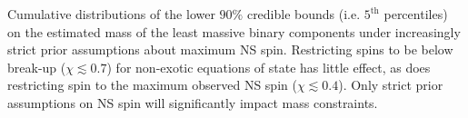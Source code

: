 \label{fig:restricted_priors} Cumulative distributions of the lower $90\%$ credible bounds (i.e. $5^\mathrm{th}$ percentiles) on the estimated mass of the least massive binary components under increasingly strict prior assumptions about maximum NS spin.  Restricting spins to be below break-up ($\chi\lesssim0.7$) for non-exotic equations of state has little effect, as does restricting spin to the maximum observed NS spin ($\chi\lesssim0.4$).  Only strict prior assumptions on NS spin will significantly impact mass constraints.
  
  